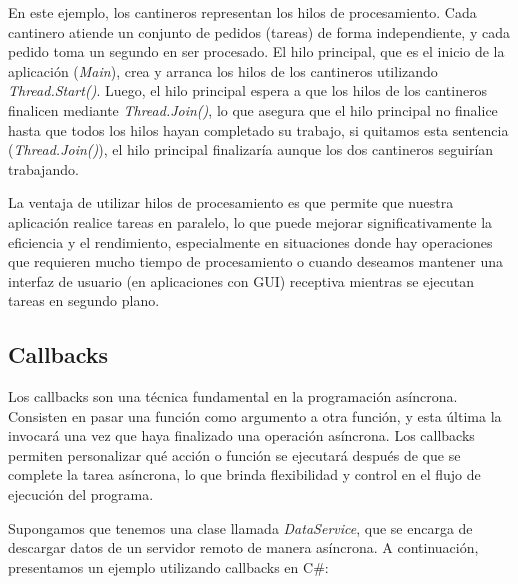 \documentclass[executivepaper]{article}
\begin{document}
En este ejemplo, los cantineros representan los hilos de procesamiento. Cada cantinero atiende un conjunto de pedidos (tareas) de forma independiente, y cada pedido toma un segundo en ser procesado. El hilo principal, que es el inicio de la aplicación (\emph{Main}), crea y arranca los hilos de los cantineros utilizando \emph{Thread.Start()}. Luego, el hilo principal espera a que los hilos de los cantineros finalicen mediante \emph{Thread.Join()}, lo que asegura que el hilo principal no finalice hasta que todos los hilos hayan completado su trabajo, si quitamos esta sentencia (\emph{Thread.Join()}), el hilo principal finalizaría aunque los dos cantineros seguirían trabajando.

La ventaja de utilizar hilos de procesamiento es que permite que nuestra aplicación realice tareas en paralelo, lo que puede mejorar significativamente la eficiencia y el rendimiento, especialmente en situaciones donde hay operaciones que requieren mucho tiempo de procesamiento o cuando deseamos mantener una interfaz de usuario (en aplicaciones con GUI) receptiva mientras se ejecutan tareas en segundo plano.

\subsection{Callbacks}

Los callbacks son una técnica fundamental en la programación asíncrona. Consisten en pasar una función como argumento a otra función, y esta última la invocará una vez que haya finalizado una operación asíncrona. Los callbacks permiten personalizar qué acción o función se ejecutará después de que se complete la tarea asíncrona, lo que brinda flexibilidad y control en el flujo de ejecución del programa.

Supongamos que tenemos una clase llamada \emph{DataService}, que se encarga de descargar datos de un servidor remoto de manera asíncrona. A continuación, presentamos un ejemplo utilizando callbacks en C\#:
\end{document}
